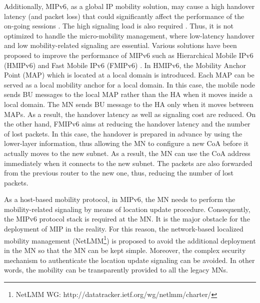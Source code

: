 Additionally, MIPv6, as a global IP mobility solution, may cause a  high handover latency (and packet loss) that could significantly affect the performance of the on-going sessions \cite{HO_comparison_Makaya, HO_comparison_Lee}. The high signaling load is also required \cite{HO_comparison_Makaya, HO_comparison_Lee}. Thus, it is not optimized to handle the micro-mobility management, where low-latency handover and low mobility-related signaling are essential. Various solutions have been proposed to improve the performance of MIPv6 such as Hierarchical Mobile IPv6 (HMIPv6) \cite{HMIPv6} and Fast Mobile IPv6 (FMIPv6) \cite{FMIPv6}. In HMIPv6, the Mobility Anchor Point (MAP) which is located at a local domain is introduced. Each MAP can be served as a local mobility anchor for a local domain. In this case, the mobile node sends BU messages to the local MAP rather than the HA when it moves inside a local domain. The MN sends BU message to the HA only when it moves between MAPs. As a result, the handover latency as well as signaling cost are reduced. On the other hand, FMIPv6 aims at reducing the handover latency and the number of lost packets. In this case, the handover is prepared in advance by using the lower-layer information, thus allowing the MN to configure a new CoA before it actually moves to the new subnet. As a result, the MN can use the CoA address immediately when it connects to the new subnet. The packets are also forwarded from the previous router to the new one, thus, reducing the number of lost packets. 

As a host-based mobility protocol, in MIPv6, the MN needs to perform the mobility-related signaling by means of location update procedure. Consequently, the MIPv6 protocol stack is required at the MN. It is the major obstacle for the deployment of MIP in the reality. For this reason, the network-based localized mobility management (NetLMM\footnote{NetLMM WG: http://datatracker.ietf.org/wg/netlmm/charter/}) is proposed to avoid the additional deployment in the MN so that the MN can be kept simple. Moreover, the complex security mechanism to authenticate the location update signaling can be avoided. In other words, the mobility can be transparently provided to all the legacy MNs. 

